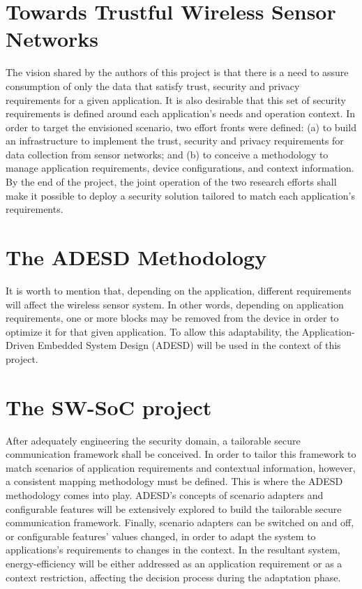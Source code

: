 \documentclass{acm_proc_article-sp}
\newcommand{\fig}[4][htb]{
  \begin{figure}[#1]
    {\centering{\texttt{[image: fig/\#2]}}\par}
    \label{fig:#2}
  \end{figure}
}
\newcommand{\tab}[4][h]{
  \begin{table}[h]
    {\centering\footnotesize\textsf{}\par}
    \label{tab:#2}
  \end{table}
}
\begin{document}
\section*{Towards Trustful Wireless Sensor Networks}

The vision shared by the authors of this project is that there is a need to assure consumption of only the data that satisfy trust, security and privacy requirements for a given application. It is also desirable that this set of security requirements is defined around each application's needs and operation context. In order to target the envisioned scenario, two effort fronts were defined: (a) to build an infrastructure to implement the trust, security and privacy requirements for data collection from sensor networks; \cite{Frohlich:DASC:2011} and (b) to conceive a methodology to manage application requirements, device configurations, and context information. By the end of the project, the joint operation of the two research efforts shall make it possible to deploy a security solution tailored to match each application's
requirements.

\newpage

\section*{The ADESD Methodology}

\fig{adesd}{}{width=\columnwidth}

It is worth to mention that, depending on the application, different requirements will affect the wireless sensor system. In other words, depending on application requirements, one or more blocks may be removed from the device in order to optimize it for that given application. To allow this adaptability, the Application-Driven Embedded System Design (ADESD) will be used in the        context of this project. \cite{Frohlich:PHD:2001} 

\section*{The SW-SoC project}

After adequately engineering the security domain, a tailorable secure communication framework shall be conceived. In order to tailor this framework to match scenarios of application requirements and contextual information, however, a consistent mapping methodology must be defined. This is where the ADESD methodology comes into play. ADESD's concepts of scenario adapters and configurable features will be extensively explored to build the tailorable secure communication framework.
Finally, scenario adapters can be switched on and off, or configurable features'
values changed, in order to adapt the system to applications's requirements to changes in the context. In the resultant system, energy-efficiency will be either addressed as an application requirement or as a context restriction, affecting the decision process during the adaptation phase.



\end{document}
